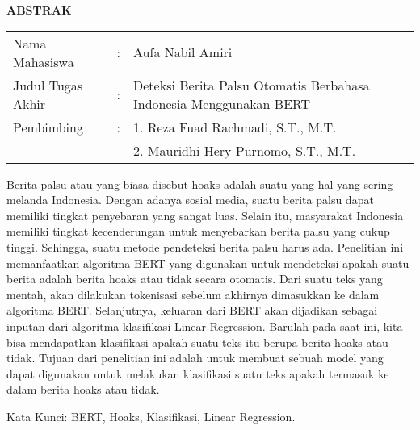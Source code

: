\begin{center}
  \large\textbf{ABSTRAK}
\end{center}


\vspace{2ex}

\begingroup
\setlength{\tabcolsep}{0pt}

\noindent
\begin{tabularx}{\textwidth}{l >{\centering}m{2em} X}
  Nama Mahasiswa    & : & Aufa Nabil Amiri                                                   \\

  Judul Tugas Akhir & : & Deteksi Berita Palsu Otomatis Berbahasa Indonesia Menggunakan BERT \\

  Pembimbing        & : & 1. Reza Fuad Rachmadi, S.T., M.T.                                  \\
                    &   & 2. Mauridhi Hery Purnomo, S.T., M.T.                               \\
\end{tabularx}
\endgroup

Berita palsu atau yang biasa disebut hoaks adalah suatu yang hal yang sering melanda Indonesia. Dengan adanya sosial media, suatu berita palsu dapat memiliki tingkat penyebaran yang sangat luas. Selain itu, masyarakat Indonesia memiliki tingkat kecenderungan untuk menyebarkan berita palsu yang cukup tinggi. Sehingga, suatu metode pendeteksi berita palsu harus ada. Penelitian ini memanfaatkan algoritma BERT yang digunakan untuk mendeteksi apakah suatu berita adalah berita hoaks atau tidak secara otomatis. Dari suatu teks yang mentah, akan dilakukan tokenisasi sebelum akhirnya dimasukkan ke dalam algoritma BERT. Selanjutnya, keluaran dari BERT akan dijadikan sebagai inputan dari algoritma klasifikasi Linear Regression.  Barulah pada saat ini, kita bisa mendapatkan klasifikasi apakah suatu teks itu berupa berita hoaks atau tidak. Tujuan dari penelitian ini adalah untuk membuat sebuah model yang dapat digunakan untuk melakukan klasifikasi suatu teks apakah termasuk ke dalam berita hoaks atau tidak.

Kata Kunci:   BERT, Hoaks, Klasifikasi, Linear Regression.
